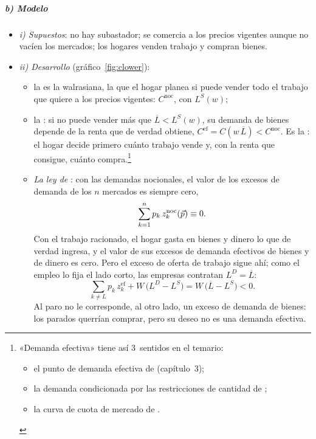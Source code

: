\documentclass[11pt]{article}
\begin{document}
\subparagraph{b) Modelo}

\begin{itemize}
\item \emph{i) Supuestos}: no hay subastador; se comercia a los precios vigentes aunque no vacíen los mercados; los hogares venden trabajo y compran bienes.
\item \emph{ii) Desarrollo} (gráfico~\ref{fig:clower}):
  \begin{itemize}
  \item la  es la walrasiana, la que el hogar planea si puede vender todo el trabajo que quiere a los precios vigentes: $C^{\mathrm{noc}}$, con $L^S(w)$;
  \item la : si no puede vender más que $\overline{L}<L^S(w)$, su demanda de bienes depende de la renta que de verdad obtiene, $C^{\mathrm{ef}}=C(w\,\overline{L})<C^{\mathrm{noc}}$. Es la : el hogar decide primero cuánto trabajo vende y, con la renta que consigue, cuánto compra.\footnote{«Demanda efectiva» tiene así 3~sentidos en el temario:
\begin{itemize}
\item el punto de demanda efectiva de  (capítulo~3);
\item la demanda condicionada por las restricciones de cantidad de ;
\item la curva de cuota de mercado de  .
\end{itemize}}
  \item \emph{La ley de } : con las demandas nocionales, el valor de los excesos de demanda de los $n$ mercados es siempre cero,
    \begin{equation}
    \sum_{k=1}^{n}p_k\,z_k^{\mathrm{noc}}(\vec{p})\equiv 0. \label{eq:walras-nocional}
    \end{equation}
    Con el trabajo racionado, el hogar gasta en bienes y dinero lo que de verdad ingresa, y el valor de sus excesos de demanda efectivos de bienes y de dinero es cero. Pero el exceso de oferta de trabajo sigue ahí; como el empleo lo fija el lado corto, las empresas contratan $L^D=\overline{L}$:
    \begin{equation}
    \sum_{k\neq L}p_k\,z_k^{\mathrm{ef}}+W\,\big(L^D-L^S\big)=W\,\big(\overline{L}-L^S\big)<0. \label{eq:walras-efectiva}
    \end{equation}
    Al paro no le corresponde, al otro lado, un exceso de demanda de bienes: los parados querrían comprar, pero su deseo no es una demanda efectiva.

\end{itemize}
\end{itemize}
\end{document}
